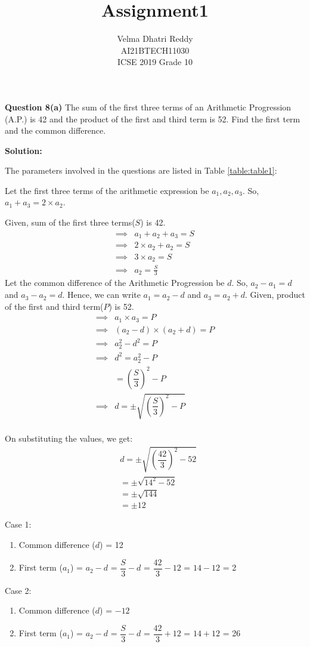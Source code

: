 \documentclass[journal ,12pt, twocolumn]{IEEEtran}
\title{Assignment1}
\author{Velma Dhatri Reddy \\ \normalsize AI21BTECH11030 \\ \vspace*{10pt} \Large ICSE 2019 Grade 10}
\begin{document}
\maketitle
\textbf{Question 8(a)}
The sum of the first three terms of an Arithmetic Progression (A.P.) is 42 and the product of the first and third term is 52. Find the first term and the common difference.

\textbf{Solution:}

The parameters involved in the questions are listed in Table \eqref{table:table1}:
\begin{table}[ht!]
	
\caption{}
\label{table:table1}	
\end{table}

Let the first three terms of the arithmetic expression be $a_1, a_2, a_3$.
So, $a_1 + a_3 = 2\times a_2$.

Given, sum of the first three terms($S$) is 42.
\begin{align}
    \implies
    &a_1 + a_2 + a_3 = S\\
    \implies
    &2 \times a_2 + a_2 = S\\
    \implies
    & 3\times a_2 = S\\
    \implies
    & a_2 = \frac{S}{3}
\end{align}
Let the common difference of the Arithmetic Progression be $d$.
So, $a_2 - a_1 = d$ and $a_3 - a_2 = d$.
Hence, we can write $ a_1 = a_2 - d$ and $ a_3 = a_2 + d$.
Given, product of the first and third term($P$) is 52.
\begin{align}
    \implies
    &a_1 \times a_3 = P\\
    \implies 
    &(a_2 - d) \times (a_2 + d) = P\\
    \implies
    &a_2^2 - d^2 = P\\
    \implies
    &d^2 = a_2^2 - P\\
    &= \left(\dfrac{S}{3} \right)^2 - P\\
    \implies
    &d = \pm \sqrt{\left(\dfrac{S}{3} \right)^2 - P}\\
\end{align}

On substituting the values, we get:
\begin{align}
    &d = \pm \sqrt{\left(\dfrac{42}{3} \right)^2 - 52}\\
    &= \pm \sqrt{14^2 - 52}\\
    &= \pm \sqrt{144}\\
    &= \pm12
\end{align}

Case 1:
\begin{enumerate}[label=(\roman*)]
		\item Common difference ($d$) = 12
		\item First term ($a_1$) = $a_2 - d$ = $\dfrac{S}{3}- d$ = $\dfrac{42}{3} - 12$ = $14 - 12$ = 2
\end{enumerate}

Case 2:
\begin{enumerate}[label=(\roman*)]
		\item Common difference ($d$) = $-12$
		\item First term ($a_1$) = $a_2 - d$ = $\dfrac{S}{3}- d$ = $\dfrac{42}{3} + 12$ = $14 + 12$ = 26
\end{enumerate}
\end{document}
